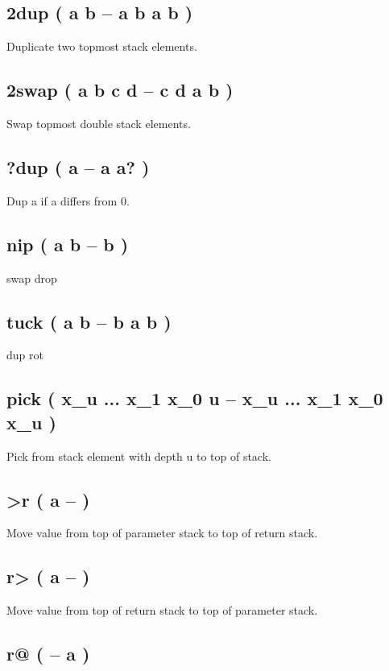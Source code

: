 \subsection{2dup ( a b -- a b a b )}

Duplicate two topmost stack elements.

\subsection{2swap ( a b c d -- c d a b )}

Swap topmost double stack elements.

\subsection{?dup ( a -- a a? )}

Dup a if a differs from 0.

\subsection{nip ( a b -- b )}

swap drop

\subsection{tuck ( a b -- b a b )}

dup rot

\subsection{pick ( x\_u ... x\_1 x\_0 u -- x\_u ... x\_1 x\_0 x\_u )}

Pick from stack element with depth u to top of stack.

\subsection{>r ( a -- )}

Move value from top of parameter stack to top of return stack. 

\subsection{r> ( a -- )}

Move value from top of return stack to top of parameter stack. 

\subsection{r@ ( -- a )}

